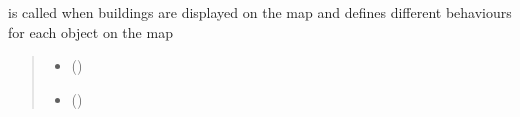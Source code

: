 \documentclass[letterpaper,10pt,english]{sphinxmanual}
\begin{document}

\begin{fulllineitems}
\label{\detokenize{docs_gui/js_api/postcode_editor/display_postcode:onEachFeature}}
\pysigstartsignatures
{}
\pysigstopsignatures
\sphinxAtStartPar
is called when buildings are displayed on the map and defines different behaviours for each object on the map
\begin{quote}\begin{description}
\begin{itemize}
\item {} 
\sphinxAtStartPar
{} () \textendash{} 

\item {} 
\sphinxAtStartPar
{} () \textendash{} 

\end{itemize}

\end{description}\end{quote}

\end{fulllineitems}

\end{document}

